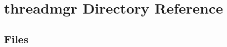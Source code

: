 \section{threadmgr Directory Reference}
\label{dir_4228a773620fae5549c394c816e8b3db}
\subsection*{Files}
\begin{DoxyCompactItemize}
\end{DoxyCompactItemize}
